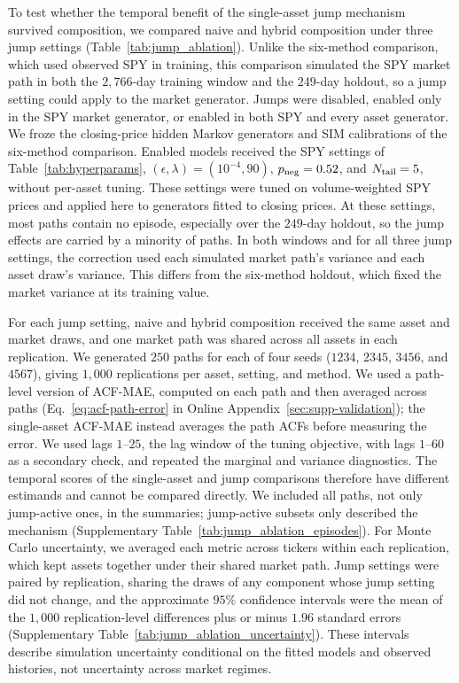 To test whether the temporal benefit of the single-asset jump
mechanism survived composition, we compared naive and hybrid
composition under three jump settings (Table~\ref{tab:jump_ablation}).
Unlike the six-method comparison, which used observed SPY in
training, this comparison simulated the SPY market path in both the
$2{,}766$-day training window and the $249$-day holdout, so a jump
setting could apply to the market generator. Jumps were disabled,
enabled only in the SPY market generator, or enabled in both SPY and
every asset generator. We froze the closing-price hidden Markov generators and SIM
calibrations of the six-method comparison. Enabled models
received the SPY settings of Table~\ref{tab:hyperparams},
$(\epsilon,\lambda)=(10^{-4},90)$, $p_{\rm neg}=0.52$, and
$N_{\rm tail}=5$, without per-asset tuning. These settings were tuned on volume-weighted SPY prices and applied
here to generators fitted to closing prices. At these settings,
most paths contain no episode, especially over the $249$-day holdout,
so the jump effects are carried by a minority of paths. In both windows and for all three jump settings, the correction used
each simulated market path's variance and each asset draw's variance.
This differs from the six-method holdout, which fixed the market
variance at its training value.

For each jump setting, naive and hybrid composition received the same
asset and market draws, and one market path was
shared across all assets in each replication. We generated $250$
paths for each of four seeds ($1234$, $2345$, $3456$, and $4567$),
giving $1{,}000$ replications per asset, setting, and method. We used a path-level version of ACF-MAE, computed on each path and
then averaged across paths (Eq.~\eqref{eq:acf-path-error} in Online
Appendix~\ref{sec:supp-validation}); the single-asset ACF-MAE instead
averages the path ACFs before measuring the error. We used
lags $1$--$25$, the lag window of the tuning objective, with lags
$1$--$60$ as a secondary check, and repeated the marginal and variance
diagnostics. The temporal scores of the single-asset and jump comparisons
therefore have different estimands and cannot be compared directly. We included all paths, not only jump-active ones, in the summaries;
jump-active subsets only described the mechanism
(Supplementary Table~\ref{tab:jump_ablation_episodes}). For Monte Carlo uncertainty, we averaged each metric across tickers
within each replication, which kept assets together under their
shared market path. Jump settings were paired by replication, sharing
the draws of any component whose jump setting did not change, and the
approximate $95\%$ confidence intervals were the mean of the $1{,}000$
replication-level differences plus or minus $1.96$ standard errors
(Supplementary Table~\ref{tab:jump_ablation_uncertainty}). These intervals describe simulation
uncertainty conditional on the fitted models and observed histories,
not uncertainty across market regimes.
